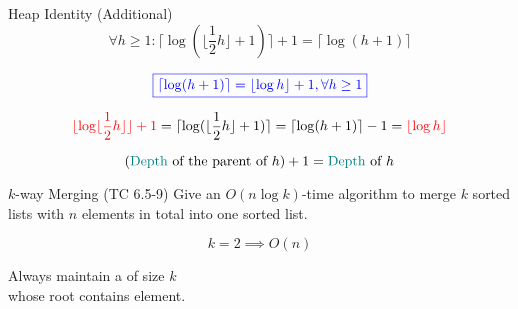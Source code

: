 
\begin{frame}{}
  \begin{exampleblock}{Heap Identity (Additional)}
    \[
      \forall h \ge 1: \lceil \log(\lfloor \frac{1}{2}h \rfloor + 1)\rceil + 1 = \lceil \log (h+1) \rceil
    \]
  \end{exampleblock}

  \pause
  \[
    \textcolor{blue}{\boxed{\lceil \log (h + 1) \rceil = \lfloor \log h \rfloor + 1, \forall h \ge 1}}
  \]

  \pause
  \[
    \textcolor{red}{\lfloor \log \lfloor \frac{1}{2} h \rfloor \rfloor + 1}
    = \lceil \log(\lfloor \frac{1}{2}h \rfloor + 1)\rceil 
    = \lceil \log (h+1) \rceil - 1
    = \textcolor{red}{\lfloor \log h \rfloor}
  \]

  \pause
  \[
    (\textcolor{teal}{\text{Depth }} \text{of the parent of } h) + 1 = \textcolor{teal}{\text{Depth }} \text{of } h
  \]
\end{frame}

\begin{frame}{}
  \begin{exampleblock}{$k$-way Merging (TC 6.5-9)}
    Give an $O(n \log k)$-time algorithm to merge $k$ sorted lists with $n$ elements in total
    into one sorted list.
  \end{exampleblock}

  \pause
  \vspace{0.20cm}
  \[
    k = 2 \implies O(n)
  \]

  \pause
  \vspace{0.20cm}
  \begin{center}
    Always maintain a  of size $k$ \\[5pt]
    whose root contains  element.
  \end{center}
\end{frame}


